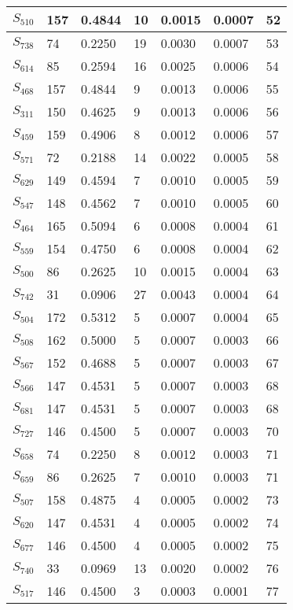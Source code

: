 \begin{xltabular}{\textwidth}{|X|X|X|X|X|X|X|}
 $S_{510}$ & 157 & 0.4844 & 10 & 0.0015 & 0.0007 & 52 \\ \hline
 $S_{738}$ & 74 & 0.2250 & 19 & 0.0030 & 0.0007 & 53 \\ \hline
 $S_{614}$ & 85 & 0.2594 & 16 & 0.0025 & 0.0006 & 54 \\ \hline
 $S_{468}$ & 157 & 0.4844 & 9 & 0.0013 & 0.0006 & 55 \\ \hline
 $S_{311}$ & 150 & 0.4625 & 9 & 0.0013 & 0.0006 & 56 \\ \hline
 $S_{459}$ & 159 & 0.4906 & 8 & 0.0012 & 0.0006 & 57 \\ \hline
 $S_{571}$ & 72 & 0.2188 & 14 & 0.0022 & 0.0005 & 58 \\ \hline
 $S_{629}$ & 149 & 0.4594 & 7 & 0.0010 & 0.0005 & 59 \\ \hline
 $S_{547}$ & 148 & 0.4562 & 7 & 0.0010 & 0.0005 & 60 \\ \hline
 $S_{464}$ & 165 & 0.5094 & 6 & 0.0008 & 0.0004 & 61 \\ \hline
 $S_{559}$ & 154 & 0.4750 & 6 & 0.0008 & 0.0004 & 62 \\ \hline
 $S_{500}$ & 86 & 0.2625 & 10 & 0.0015 & 0.0004 & 63 \\ \hline
 $S_{742}$ & 31 & 0.0906 & 27 & 0.0043 & 0.0004 & 64 \\ \hline
 $S_{504}$ & 172 & 0.5312 & 5 & 0.0007 & 0.0004 & 65 \\ \hline
 $S_{508}$ & 162 & 0.5000 & 5 & 0.0007 & 0.0003 & 66 \\ \hline
 $S_{567}$ & 152 & 0.4688 & 5 & 0.0007 & 0.0003 & 67 \\ \hline
 $S_{566}$ & 147 & 0.4531 & 5 & 0.0007 & 0.0003 & 68 \\ \hline
 $S_{681}$ & 147 & 0.4531 & 5 & 0.0007 & 0.0003 & 68 \\ \hline
 $S_{727}$ & 146 & 0.4500 & 5 & 0.0007 & 0.0003 & 70 \\ \hline
 $S_{658}$ & 74 & 0.2250 & 8 & 0.0012 & 0.0003 & 71 \\ \hline
 $S_{659}$ & 86 & 0.2625 & 7 & 0.0010 & 0.0003 & 71 \\ \hline
 $S_{507}$ & 158 & 0.4875 & 4 & 0.0005 & 0.0002 & 73 \\ \hline
 $S_{620}$ & 147 & 0.4531 & 4 & 0.0005 & 0.0002 & 74 \\ \hline
 $S_{677}$ & 146 & 0.4500 & 4 & 0.0005 & 0.0002 & 75 \\ \hline
 $S_{740}$ & 33 & 0.0969 & 13 & 0.0020 & 0.0002 & 76 \\ \hline
 $S_{517}$ & 146 & 0.4500 & 3 & 0.0003 & 0.0001 & 77 \\ \hline

\end{xltabular}
